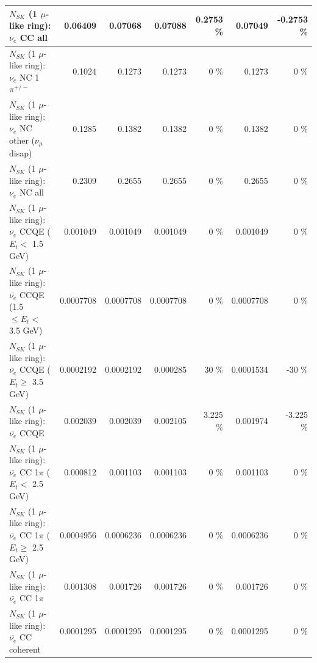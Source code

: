 \begin{table}
\begin{tabular}{| l | r | r | r  r | r  r |}
                                  $N_{SK}$ (1 $\mu$-like ring): $\nu_{e}$ CC all &         0.06409 &         0.07068 &         0.07088 &   0.2753 \%  &         0.07049 &  -0.2753 \%  \\ 
\hline
                           $N_{SK}$ (1 $\mu$-like ring): $\nu_e$ NC 1$\pi^{+/-}$ &          0.1024 &          0.1273 &          0.1273 &        0 \%  &          0.1273 &        0 \%  \\ 
                $N_{SK}$ (1 $\mu$-like ring): $\nu_e$ NC other ($\nu_\mu$ disap) &          0.1285 &          0.1382 &          0.1382 &        0 \%  &          0.1382 &        0 \%  \\ 
                                  $N_{SK}$ (1 $\mu$-like ring): $\nu_{e}$ NC all &          0.2309 &          0.2655 &          0.2655 &        0 \%  &          0.2655 &        0 \%  \\ 
\hline
\hline
\hline
            $N_{SK}$ (1 $\mu$-like ring): $\bar{\nu_e}$ CCQE ($E_{t} <$ 1.5 GeV) &        0.001049 &        0.001049 &        0.001049 &        0 \%  &        0.001049 &        0 \%  \\ 
   $N_{SK}$ (1 $\mu$-like ring): $\bar{\nu_e}$ CCQE (1.5 $\leq E_{t} <$ 3.5 GeV) &       0.0007708 &       0.0007708 &       0.0007708 &        0 \%  &       0.0007708 &        0 \%  \\ 
         $N_{SK}$ (1 $\mu$-like ring): $\bar{\nu_e}$ CCQE ($E_{t} \geq$ 3.5 GeV) &       0.0002192 &       0.0002192 &        0.000285 &       30 \%  &       0.0001534 &      -30 \%  \\ 
\hline
                                $N_{SK}$ (1 $\mu$-like ring): $\bar{\nu_e}$ CCQE &        0.002039 &        0.002039 &        0.002105 &    3.225 \%  &        0.001974 &   -3.225 \%  \\ 
\hline
       $N_{SK}$ (1 $\mu$-like ring): $\bar{\nu_e}$ CC 1$\pi$ ($E_{t} <$ 2.5 GeV) &        0.000812 &        0.001103 &        0.001103 &        0 \%  &        0.001103 &        0 \%  \\ 
    $N_{SK}$ (1 $\mu$-like ring): $\bar{\nu_e}$ CC 1$\pi$ ($E_{t} \geq$ 2.5 GeV) &       0.0004956 &       0.0006236 &       0.0006236 &        0 \%  &       0.0006236 &        0 \%  \\ 
\hline
                           $N_{SK}$ (1 $\mu$-like ring): $\bar{\nu_e}$ CC 1$\pi$ &        0.001308 &        0.001726 &        0.001726 &        0 \%  &        0.001726 &        0 \%  \\ 
                         $N_{SK}$ (1 $\mu$-like ring): $\bar{\nu_e}$ CC coherent &       0.0001295 &       0.0001295 &       0.0001295 &        0 \%  &       0.0001295 &        0 \%  \\ 

\end{tabular}
\end{table}
